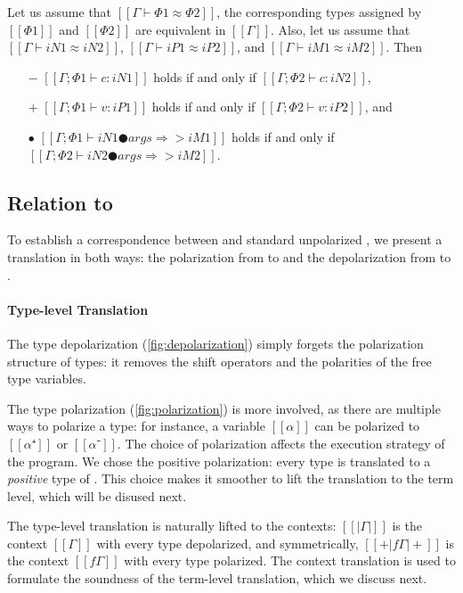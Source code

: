 \begin{property}
  Let us assume that $[[Γ ⊢ Φ1 ≈ Φ2]]$, \ie  
  the corresponding types assigned by $[[Φ1]]$ and
  $[[Φ2]]$ are equivalent in $[[Γ]]$.
  Also, let us assume that 
  $[[Γ ⊢ iN1 ≈ iN2]]$, $[[Γ ⊢ iP1 ≈ iP2]]$,
  and $[[Γ ⊢ iM1 ≈ iM2]]$. Then
  \begin{itemize}
    \item [$-$] $[[Γ ; Φ1 ⊢ c : iN1]]$ holds if and only if $[[Γ ; Φ2 ⊢ c : iN2]]$,
    \item [$+$] $[[Γ ; Φ1 ⊢ v : iP1]]$ holds if and only if $[[Γ ; Φ2 ⊢ v : iP2]]$, and
    \item [$\bullet$] $[[Γ; Φ1 ⊢ iN1 ● args ⇒> iM1]]$ holds if and only if $[[Γ; Φ2 ⊢ iN2 ● args ⇒> iM2]]$.
  \end{itemize}
\end{property}

\subsection{Relation to \systemf}
\label{sec:rel-to-systemf}

To establish a correspondence between \fexists and standard unpolarized \systemf,
we present a translation in both ways: the polarization from \systemf to \fexists
and the depolarization from \fexists to \systemf.



\paragraph{Type-level Translation}

The type depolarization (\cref{fig:depolarization}) simply forgets the polarization structure of types:
it removes the shift operators and the polarities of the free type variables.

The type polarization (\cref{fig:polarization}) is more involved, as there are multiple
ways to polarize a type: for instance, a variable $[[α]]$ can be polarized to $[[α⁺]]$ or $[[α⁻]]$.
The choice of polarization affects the execution strategy of the program.
We chose the positive polarization: every \systemf type is translated to a \emph{positive} type of \fexists.
This choice makes it smoother to lift the translation to the term level, which will be disused next.

The type-level translation is naturally lifted to the contexts:
$[[|Γ|]]$ is the context $[[Γ]]$ with every type depolarized,
and symmetrically, $[[+|fΓ|+]]$ is the context $[[fΓ]]$ with every type polarized.
The context translation is used to formulate the soundness of the
 term-level translation, which we discuss next.


